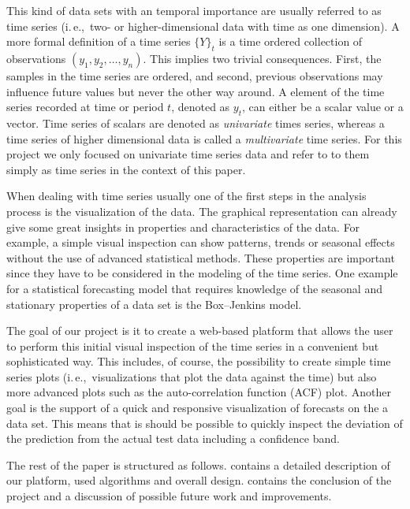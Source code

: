 \documentclass[runningheads,a4paper,11pt]{llncs}
\newcommand{\ie}{i.\,e.,\ }
\begin{document}
This kind of data sets with an temporal importance are usually referred to as time series (\ie two- or higher-dimensional data with time as one dimension). 
A more formal definition \cite{Cortez2012} of a time series \(\{Y\}_t\) is a time ordered collection of observations \((y_1, y_2, \ldots, y_n)\).
This implies two trivial consequences. 
First, the samples in the time series are ordered, and second, previous observations may influence future values but never the other way around.
A element of the time series recorded at time or period \(t\), denoted as \(y_t\), can either be a scalar value or a vector.
Time series of scalars are denoted as \emph{univariate} times series, whereas a time series of higher dimensional data is called a \emph{multivariate} time series.
For this project we only focused on univariate time series data and refer to to them simply as time series in the context of this paper.

When dealing with time series usually one of the first steps in the analysis process is the visualization of the data.
The graphical representation can already give some great insights in properties and characteristics of the data.
For example, a simple visual inspection can show patterns, trends or seasonal effects without the use of advanced statistical methods. 
These properties are important since they have to be considered in the modeling of the time series.
One example for a statistical forecasting model that requires knowledge of the seasonal and stationary properties of a data set is the Box--Jenkins \cite{Box1976} model.

The goal of our project is it to create a web-based platform that allows the user to perform this initial visual inspection of the time series in a convenient but sophisticated way.
This includes, of course, the possibility to create simple time series plots (\ie visualizations that plot the data against the time) but also more advanced plots such as the auto-correlation function (ACF) plot.
Another goal is the support of a quick and responsive visualization of forecasts on the a data set. 
This means that is should be possible to quickly inspect the deviation of the prediction from the actual test data including a confidence band.

The rest of the paper is structured as follows. 
 contains a detailed description of our platform, used algorithms and overall design.
 contains the conclusion of the project and a discussion of possible future work and improvements.
\end{document}
